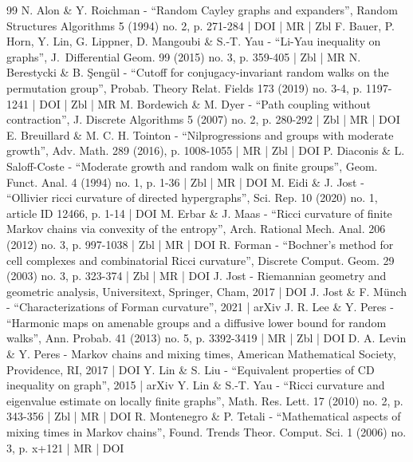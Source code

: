 \begin{thebibliography}{99}
N. Alon \& Y. Roichman - “Random Cayley graphs and expanders”, Random Structures Algorithms 5 (1994) no. 2, p. 271-284 | DOI | MR | Zbl
F. Bauer, P. Horn, Y. Lin, G. Lippner, D. Mangoubi \& S.-T. Yau - “Li-Yau inequality on graphs”, J. Differential Geom. 99 (2015) no. 3, p. 359-405 | Zbl | MR
N. Berestycki \& B. Şengül - “Cutoff for conjugacy-invariant random walks on the permutation group”, Probab. Theory Relat. Fields 173 (2019) no. 3-4, p. 1197-1241 | DOI | Zbl | MR
M. Bordewich \& M. Dyer - “Path coupling without contraction”, J. Discrete Algorithms 5 (2007) no. 2, p. 280-292 | Zbl | MR | DOI
E. Breuillard \& M. C. H. Tointon - “Nilprogressions and groups with moderate growth”, Adv. Math. 289 (2016), p. 1008-1055 | MR | Zbl | DOI
P. Diaconis \& L. Saloff-Coste - “Moderate growth and random walk on finite groups”, Geom. Funct. Anal. 4 (1994) no. 1, p. 1-36 | Zbl | MR | DOI
M. Eidi \& J. Jost - “Ollivier ricci curvature of directed hypergraphs”, Sci. Rep. 10 (2020) no. 1, article ID 12466, p. 1-14 | DOI
M. Erbar \& J. Maas - “Ricci curvature of finite Markov chains via convexity of the entropy”, Arch. Rational Mech. Anal. 206 (2012) no. 3, p. 997-1038 | Zbl | MR | DOI
R. Forman - “Bochner’s method for cell complexes and combinatorial Ricci curvature”, Discrete Comput. Geom. 29 (2003) no. 3, p. 323-374 | Zbl | MR | DOI
J. Jost - Riemannian geometry and geometric analysis, Universitext, Springer, Cham, 2017 | DOI
J. Jost \& F. Münch - “Characterizations of Forman curvature”, 2021 | arXiv
J. R. Lee \& Y. Peres - “Harmonic maps on amenable groups and a diffusive lower bound for random walks”, Ann. Probab. 41 (2013) no. 5, p. 3392-3419 | MR | Zbl | DOI
D. A. Levin \& Y. Peres - Markov chains and mixing times, American Mathematical Society, Providence, RI, 2017 | DOI
Y. Lin \& S. Liu - “Equivalent properties of CD inequality on graph”, 2015 | arXiv
Y. Lin \& S.-T. Yau - “Ricci curvature and eigenvalue estimate on locally finite graphs”, Math. Res. Lett. 17 (2010) no. 2, p. 343-356 | Zbl | MR | DOI
R. Montenegro \& P. Tetali - “Mathematical aspects of mixing times in Markov chains”, Found. Trends Theor. Comput. Sci. 1 (2006) no. 3, p. x+121 | MR | DOI

\end{thebibliography}
